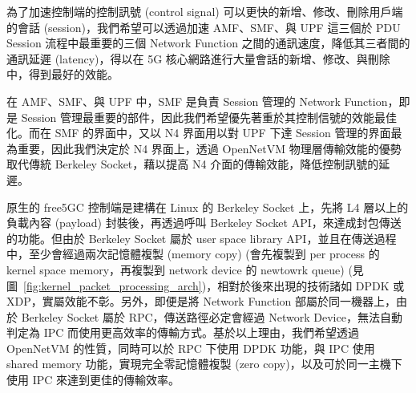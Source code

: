 

為了加速控制端的控制訊號 (control signal) 可以更快的新增、修改、刪除用戶端的會話 (session)，我們希望可以透過加速 AMF、SMF、與 UPF 這三個於 PDU Session 流程中最重要的三個 Network Function 之間的通訊速度，降低其三者間的通訊延遲 (latency)，得以在 5G 核心網路進行大量會話的新增、修改、與刪除中，得到最好的效能。

在 AMF、SMF、與 UPF 中，SMF 是負責 Session 管理的 Network Function，即是 Session 管理最重要的部件，因此我們希望優先著重於其控制信號的效能最佳化。而在 SMF 的界面中，又以 N4 界面用以對 UPF 下達 Session 管理的界面最為重要，因此我們決定於 N4 界面上，透過 OpenNetVM 物理層傳輸效能的優勢取代傳統 Berkeley Socket，藉以提高 N4 介面的傳輸效能，降低控制訊號的延遲。


原生的 free5GC 控制端是建構在 Linux 的 Berkeley Socket 上，先將 L4 層以上的負載內容 (payload) 封裝後，再透過呼叫 Berkeley Socket API，來達成封包傳送的功能。但由於 Berkeley Socket 屬於 user space library API，並且在傳送過程中，至少會經過兩次記憶體複製 (memory copy) (會先複製到 per process 的 kernel space memory，再複製到 network device 的 newtowrk queue) (見圖~\ref{fig:kernel_packet_processing_arch})，相對於後來出現的技術諸如 DPDK 或 XDP，實屬效能不彰。另外，即便是將 Network Function 部屬於同一機器上，由於 Berkeley Socket 屬於 RPC，傳送路徑必定會經過 Network Device，無法自動判定為 IPC 而使用更高效率的傳輸方式。基於以上理由，我們希望透過 OpenNetVM 的性質，同時可以於 RPC 下使用 DPDK 功能，與 IPC 使用 shared memory 功能，實現完全零記憶體複製 (zero copy)，以及可於同一主機下使用 IPC 來達到更佳的傳輸效率。

